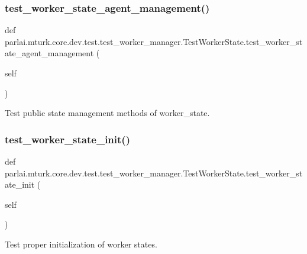 \subsubsection{\texorpdfstring{test\+\_\+worker\+\_\+state\+\_\+agent\+\_\+management()}{test\_worker\_state\_agent\_management()}}
{\footnotesize\ttfamily def parlai.\+mturk.\+core.\+dev.\+test.\+test\+\_\+worker\+\_\+manager.\+Test\+Worker\+State.\+test\+\_\+worker\+\_\+state\+\_\+agent\+\_\+management (\begin{DoxyParamCaption}\item[{}]{self }\end{DoxyParamCaption})}

\begin{DoxyVerb}Test public state management methods of worker_state.
\end{DoxyVerb}
 \mbox{\label{classparlai_1_1mturk_1_1core_1_1dev_1_1test_1_1test__worker__manager_1_1TestWorkerState_aa8a9f7fe801eb68ee6728fe3f0fc134d}} 
\subsubsection{\texorpdfstring{test\+\_\+worker\+\_\+state\+\_\+init()}{test\_worker\_state\_init()}}
{\footnotesize\ttfamily def parlai.\+mturk.\+core.\+dev.\+test.\+test\+\_\+worker\+\_\+manager.\+Test\+Worker\+State.\+test\+\_\+worker\+\_\+state\+\_\+init (\begin{DoxyParamCaption}\item[{}]{self }\end{DoxyParamCaption})}

\begin{DoxyVerb}Test proper initialization of worker states.
\end{DoxyVerb}
 

